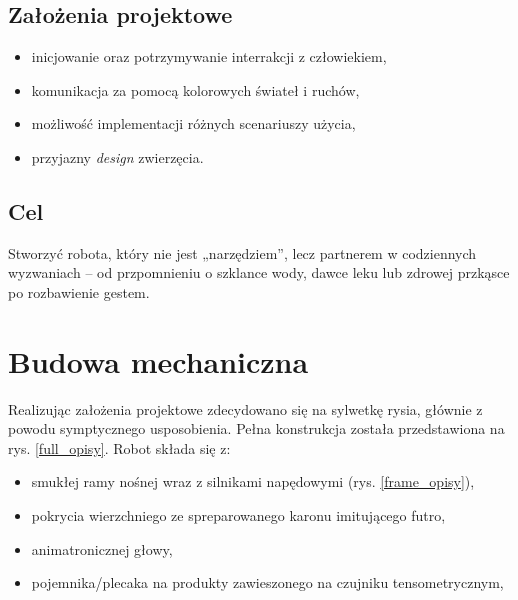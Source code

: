 \documentclass{article}
\begin{document}
        \subsection*{Założenia projektowe}
            \begin{itemize}
                \item inicjowanie oraz potrzymywanie interrakcji z człowiekiem,
                \item komunikacja za pomocą kolorowych świateł i ruchów,
                \item możliwość implementacji różnych scenariuszy użycia,
                \item przyjazny \textit{design} zwierzęcia.
            \end{itemize}

        \subsection*{Cel}
            Stworzyć robota, który nie jest „narzędziem”, lecz partnerem w codziennych wyzwaniach -- od
            przpomnieniu o szklance wody, dawce leku lub zdrowej przkąsce po rozbawienie gestem.

    \section{Budowa mechaniczna}
        Realizując założenia projektowe zdecydowano się na sylwetkę rysia, głównie z powodu symptycznego usposobienia.
        Pełna konstrukcja została przedstawiona na rys. \ref{full_opisy}.
        Robot składa się z:
        \begin{itemize}
            \item smukłej ramy nośnej wraz z silnikami napędowymi (rys. \ref{frame_opisy}),
            \item pokrycia wierzchniego ze spreparowanego karonu imitującego futro,
            \item animatronicznej głowy,
            \item pojemnika/plecaka na produkty zawieszonego na czujniku tensometrycznym,
        \end{itemize}
\end{document}
